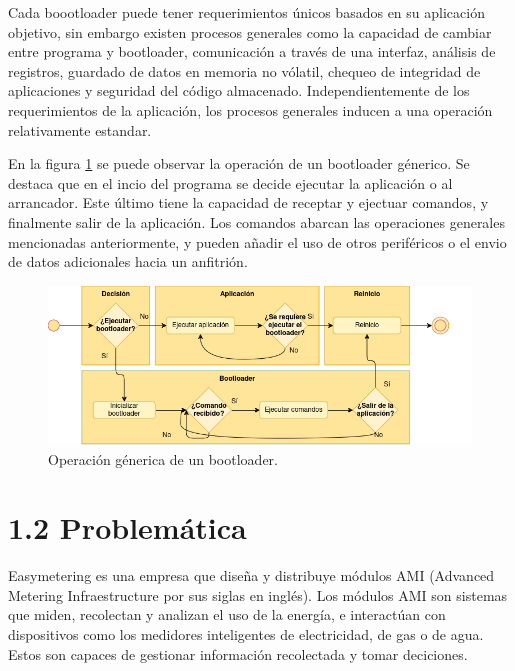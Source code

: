 \documentclass[
11pt, %
]{charter}
\begin{document}
Cada boootloader puede tener requerimientos únicos basados en su aplicación objetivo, sin embargo existen procesos generales como la capacidad de cambiar entre programa y bootloader, comunicación a través de una interfaz, análisis de registros, guardado de datos en memoria no vólatil, chequeo de integridad de aplicaciones y seguridad del código almacenado. Independientemente de los requerimientos de la aplicación, los procesos generales inducen a una operación relativamente estandar.

En la figura \ref{fig:bootloaderFlow} se puede observar la operación de un bootloader génerico. Se destaca que en el incio del programa se decide ejecutar la aplicación o al arrancador. Este último tiene la capacidad de receptar y ejectuar comandos, y finalmente salir de la aplicación. Los comandos abarcan las operaciones generales mencionadas anteriormente, y pueden añadir el uso de otros periféricos o el envio de datos adicionales hacia un anfitrión.

\begin{figure}[htpb]
\centering 
\includegraphics[width=.99\textwidth]{./Figuras/GdP-diagrams-bootloader.png}
\caption{Operación génerica de un bootloader.}
\label{fig:bootloaderFlow}
\end{figure}

\newpage

\section{1.2 Problemática}
\label{sec:s1Problematica}

Easymetering es una empresa que diseña y distribuye módulos AMI (Advanced Metering Infraestructure por sus siglas en inglés). Los módulos AMI son sistemas que miden, recolectan y analizan el uso de la energía, e interactúan con dispositivos como los medidores inteligentes de electricidad, de gas o de agua. Estos son capaces de gestionar información recolectada y tomar deciciones.
\end{document}
